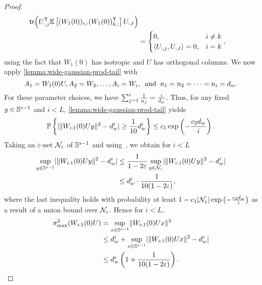 \begin{proof}
\begin{align*}
		\mathsf{tr}\Big( U_{:, j}^{\mathsf{T}}\mathbb{E}\left[ {(W_{1}(0))_{i, :} (W_{1}(0))_{k, :}^{\mathsf{T}}} \right] U_{:, \ell} \Big) \\
		                                                           & =
		\begin{cases}
			0,                              & i \neq k \\
			\langle U_{:, j}, U_{:, \ell}\rangle = 0, & i = k
		\end{cases},
	\end{align*}
	using the fact that $W_{1}(0)$ has isotropic and
	$U$ has orthogonal columns. We now apply
    \cref{lemma:wide-gaussian-prod-tail} with
    \[
        A_1 = W_{1}(0) U, A_2 = W_2, \dots, A_{i} = W_{i}, \;\; \text{and} \;\;
        n_1 = n_{2} = \dots = n_{i} = d_{w}.
    \]
    For these parameter choices, we have
    \(
        \sum_{j = 1}^{i} \frac{1}{n_j} =
        \frac{i}{d_{w}}.
    \)
    Thus, for any fixed $y \in \mathbb{S}^{s-1}$ and $i < L$,
    \cref{lemma:wide-gaussian-prod-tail} yields
	\begin{equation}
		\mathbb{P}\left\{ {\lvert \lVert W_{i:1}(0) Uy\rVert^2 - d_w^i\rvert \geq \frac{1}{10} d_w^i} \right\}
		\leq c_1 \exp\left(-\frac{c_2 d_{w}}{i} \right).
	\end{equation}
	Taking an $\varepsilon$-net $\mathcal{N}_{\varepsilon}$ of $\mathbb{S}^{s-1}$
	and using~\citep[Exercise 4.3.4]{Ver18}, we obtain for $i<L$
	\begin{align}
		\sup_{y \in \mathbb{S}^{s-1}} \lvert\lVert W_{i:1}(0) U y\rVert^2 - d_w^{i}\rvert & \leq
		\frac{1}{1 - 2 \varepsilon} \sup_{y \in \mathcal{N}_{\varepsilon}} \lvert\lVert W_{i:1}(0)Uy\rVert^2 - d_w^i\rvert \notag \\ &\leq
		d_w^i \cdot \frac{1}{10(1 - 2 \varepsilon)}, \label{eq:epsilon-net-bound}
	\end{align}
	where the last inequality holds with probability at least $1 - c_1 \lvert\mathcal{N}_{\varepsilon}\rvert \exp\left(-\frac{c_2 d_{w}}{i} \right)$
	as a result of a union bound over $\mathcal{N}_{\varepsilon}$.
	Hence for $i<L$,
	\begin{align}
		\sigma_{\max}^2(W_{i:1}(0) U) & = \sup_{x \in \mathbb{S}^{s-1}}
		\lVert W_{i:1}(0)U x\rVert^2 \notag                                                                                         \\
		                               & \leq d_w^i + \sup_{x \in \mathbb{S}^{s-1}} \lvert\lVert W_{i:1}(0) Ux\rVert^2 - d_w^i\rvert \notag     \\
		                               & \leq d_w^i \left( 1 + \frac{1}{10(1 - 2 \varepsilon)} \right). \label{eq:w1y-ub-epsnet}
	\end{align}

\end{proof}
